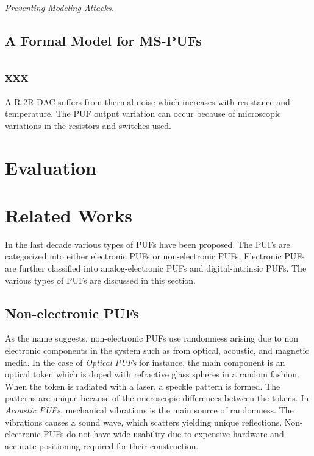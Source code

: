 {\flushleft \em Preventing Modeling Attacks.}


\subsection{A Formal Model for MS-PUFs}

\subsection{xxx}




A R-2R DAC suffers from thermal noise which increases with resistance and temperature. The PUF output variation can occur because of microscopic variations in the resistors and switches used.





\section{Evaluation}




\section{Related Works}
In the last decade various types of PUFs have been proposed. The PUFs are categorized into either
electronic PUFs or non-electronic PUFs. Electronic PUFs are further classified into analog-electronic
PUFs and digital-intrinsic PUFs. The various types of PUFs are discussed in this section.

\subsection{Non-electronic PUFs}
As the name suggests, non-electronic PUFs use randomness arising due to non electronic components in the system
such as from optical, acoustic, and magnetic media. In the case of \textit{Optical PUFs} for instance, the main 
component is an optical token which is doped with refractive glass spheres in a random fashion. When the token is 
radiated with a laser, a speckle pattern is formed. The patterns are  unique because  of the microscopic differences 
between the tokens. In \textit{Acoustic PUFs}, mechanical vibrations is the main source of
randomness. The vibrations causes a sound wave, which scatters yielding unique reflections. 
Non-electronic PUFs do not have wide usability due to expensive hardware and accurate positioning 
required for their construction.

